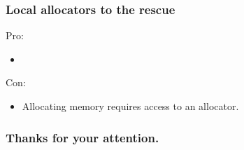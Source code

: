 \documentclass[aspectratio=43]{beamer}
\begin{document}
\begin{frame}[fragile]
  \frametitle{Local allocators to the rescue}
    Pro:
    \begin{itemize}
    \item 
    \end{itemize}

    Con:
    \begin{itemize}
    \item Allocating memory requires access to an allocator.
    \end{itemize}
\end{frame}
\fi

\begin{frame}
  \frametitle{Thanks for your attention.}
\end{frame}
\end{document}
